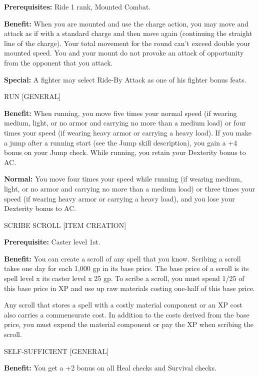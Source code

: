 \documentclass{article}
\begin{document}
\textbf{Prerequisites:} Ride 1 rank, Mounted Combat.

\textbf{Benefit:} When you are mounted and use the charge action, you may move 
and attack as if with a standard charge and then move again (continuing the straight 
line of the charge). Your total movement for the round can't exceed double your 
mounted speed. You and your mount do not provoke an attack of opportunity from 
the opponent that you attack.

\textbf{Special:} A fighter may select Ride-By Attack as one of his fighter bonus 
feats.

\vspace{12pt}
RUN [GENERAL]

\textbf{Benefit:} When running, you move five times your normal speed (if wearing 
medium, light, or no armor and carrying no more than a medium load) or four times 
your speed (if wearing heavy armor or carrying a heavy load). If you make a jump 
after a running start (see the Jump skill description), you gain a +4 bonus on 
your Jump check. While running, you retain your Dexterity bonus to AC.

\textbf{Normal:} You move four times your speed while running (if wearing medium, 
light, or no armor and carrying no more than a medium load) or three times your 
speed (if wearing heavy armor or carrying a heavy load), and you lose your Dexterity 
bonus to AC.

\vspace{12pt}
SCRIBE SCROLL [ITEM CREATION]

\textbf{Prerequisite:} Caster level 1st.

\textbf{Benefit:} You can create a scroll of any spell that you know. Scribing 
a scroll takes one day for each 1,000 gp in its base price. The base price of a 
scroll is its spell level x $ $its caster level x $ $25 gp. To scribe a scroll, 
you must spend 1/25 of this base price in XP and use up raw materials costing one-half 
of this base price.

Any scroll that stores a spell with a costly material component or an XP cost also 
carries a commensurate cost. In addition to the costs derived from the base price, 
you must expend the material component or pay the XP when scribing the scroll.

\vspace{12pt}
SELF-SUFFICIENT [GENERAL]

\textbf{Benefit:} You get a +2 bonus on all Heal checks and Survival checks.
\end{document}
